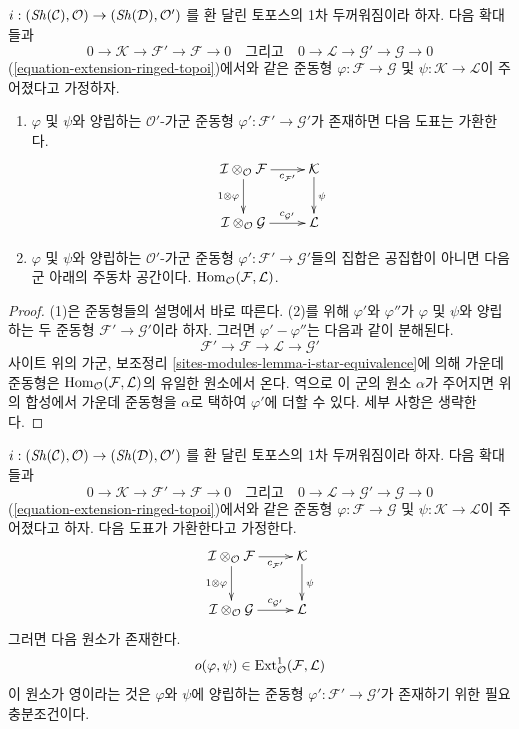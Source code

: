 \begin{lemma}
\label{lemma-inf-map-ringed-topoi}
$i : (\mathop{\mathit{Sh}}\nolimits(\mathcal{C}), \mathcal{O}) \to (\mathop{\mathit{Sh}}\nolimits(\mathcal{D}), \mathcal{O}')$
를 환 달린 토포스의 1차 두꺼워짐이라 하자. 다음 확대들과
$$
0 \to \mathcal{K} \to \mathcal{F}' \to \mathcal{F} \to 0
\quad\text{그리고}\quad
0 \to \mathcal{L} \to \mathcal{G}' \to \mathcal{G} \to 0
$$
(\ref{equation-extension-ringed-topoi})에서와 같은 준동형
$\varphi : \mathcal{F} \to \mathcal{G}$ 및
$\psi : \mathcal{K} \to \mathcal{L}$이 주어졌다고 가정하자.
\begin{enumerate}
\item $\varphi$ 및 $\psi$와 양립하는 $\mathcal{O}'$-가군 준동형
$\varphi' : \mathcal{F}' \to \mathcal{G}'$가 존재하면 다음 도표는
가환한다.
$$
\xymatrix{
\mathcal{I} \otimes_\mathcal{O} \mathcal{F}
\ar[r]_-{c_{\mathcal{F}'}} \ar[d]_{1 \otimes \varphi} &
\mathcal{K} \ar[d]^\psi \\
\mathcal{I} \otimes_\mathcal{O} \mathcal{G}
\ar[r]^-{c_{\mathcal{G}'}} &
\mathcal{L}
}
$$
\item $\varphi$ 및 $\psi$와 양립하는 $\mathcal{O}'$-가군 준동형
$\varphi' : \mathcal{F}' \to \mathcal{G}'$들의 집합은 공집합이
아니면 다음 군 아래의 주동차 공간이다.
$\mathop{\mathrm{Hom}}\nolimits_\mathcal{O}(\mathcal{F}, \mathcal{L})$.
\end{enumerate}
\end{lemma}

\begin{proof}
(1)은 준동형들의 설명에서 바로 따른다. (2)를 위해 $\varphi'$와
$\varphi''$가 $\varphi$ 및 $\psi$와 양립하는 두 준동형
$\mathcal{F}' \to \mathcal{G}'$이라 하자. 그러면
$\varphi' - \varphi''$는 다음과 같이 분해된다.
$$
\mathcal{F}' \to \mathcal{F} \to \mathcal{L} \to \mathcal{G}'
$$
사이트 위의 가군, 보조정리
\ref{sites-modules-lemma-i-star-equivalence}에 의해 가운데 준동형은
$\mathop{\mathrm{Hom}}\nolimits_\mathcal{O}(\mathcal{F}, \mathcal{L})$의 유일한 원소에서 온다.
역으로 이 군의 원소 $\alpha$가 주어지면 위의 합성에서 가운데
준동형을 $\alpha$로 택하여 $\varphi'$에 더할 수 있다. 세부 사항은
생략한다.
\end{proof}

\begin{lemma}
\label{lemma-inf-obs-map-ringed-topoi}
$i : (\mathop{\mathit{Sh}}\nolimits(\mathcal{C}), \mathcal{O}) \to (\mathop{\mathit{Sh}}\nolimits(\mathcal{D}), \mathcal{O}')$
를 환 달린 토포스의 1차 두꺼워짐이라 하자. 다음 확대들과
$$
0 \to \mathcal{K} \to \mathcal{F}' \to \mathcal{F} \to 0
\quad\text{그리고}\quad
0 \to \mathcal{L} \to \mathcal{G}' \to \mathcal{G} \to 0
$$
(\ref{equation-extension-ringed-topoi})에서와 같은 준동형
$\varphi : \mathcal{F} \to \mathcal{G}$ 및
$\psi : \mathcal{K} \to \mathcal{L}$이 주어졌다고 하자. 다음 도표가
가환한다고 가정한다.
$$
\xymatrix{
\mathcal{I} \otimes_\mathcal{O} \mathcal{F}
\ar[r]_-{c_{\mathcal{F}'}} \ar[d]_{1 \otimes \varphi} &
\mathcal{K} \ar[d]^\psi \\
\mathcal{I} \otimes_\mathcal{O} \mathcal{G}
\ar[r]^-{c_{\mathcal{G}'}} &
\mathcal{L}
}
$$
그러면 다음 원소가 존재한다.
$$
o(\varphi, \psi) \in
\mathop{\mathrm{Ext}}\nolimits^1_\mathcal{O}(\mathcal{F}, \mathcal{L})
$$
이 원소가 영이라는 것은 $\varphi$와 $\psi$에 양립하는 준동형
$\varphi' : \mathcal{F}' \to \mathcal{G}'$가 존재하기 위한
필요충분조건이다.
\end{lemma}

